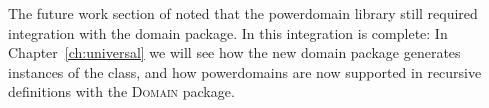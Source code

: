 The future work section of \cite{huffman08powerdomain} noted that the powerdomain library still required integration with the domain package. In  this integration is complete: In Chapter~\ref{ch:universal} we will see how the new domain package generates instances of the  class, and how powerdomains are now supported in recursive definitions with the \textsc{Domain} package.
